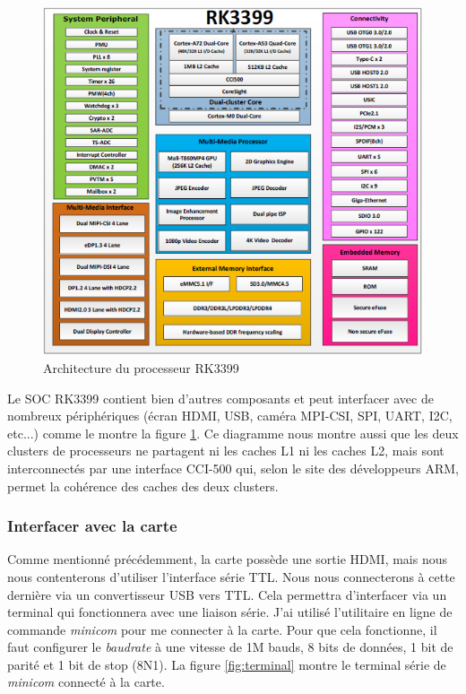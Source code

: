 \begin{figure}[H]
    \centering
    \includegraphics[width=0.45\paperwidth]{Images/RK3399_Block_Diagram.png}
    \caption{Architecture du processeur RK3399}
    \label{fig:archi_rk3399}
\end{figure}

Le SOC RK3399 contient bien d'autres composants et peut interfacer avec de nombreux périphériques (écran HDMI, USB, caméra MPI-CSI, SPI, UART, I2C, etc...) comme le montre la figure \ref{fig:archi_rk3399}. Ce diagramme nous montre aussi que les deux \gls{cluster}s de processeurs ne partagent ni les caches L1 ni les caches L2, mais sont interconnectés par une interface CCI-500 qui, selon le site des développeurs ARM, permet la cohérence des caches des deux clusters.


\subsubsection{Interfacer avec la carte}

Comme mentionné précédemment, la carte possède une sortie HDMI, mais nous nous contenterons d'utiliser l'interface série TTL. Nous nous connecterons à cette dernière via un convertisseur USB vers TTL. Cela permettra d'interfacer via un terminal qui fonctionnera avec une liaison série. J'ai utilisé l'utilitaire en ligne de commande \textit{minicom} pour me connecter à la carte. Pour que cela fonctionne, il faut configurer le \textit{baudrate} à une vitesse de 1M bauds, 8 bits de données, 1 bit de parité et 1 bit de stop (8N1).
La figure \ref{fig:terminal} montre le terminal série de \textit{minicom} connecté à la carte.


